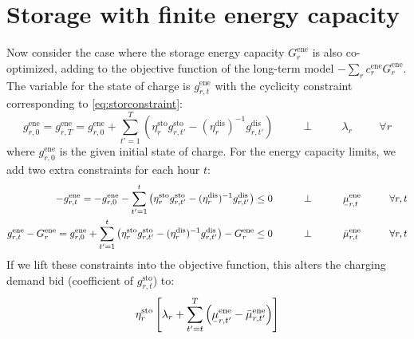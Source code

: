 \documentclass[final,3p]{elsarticle}
\def\l{\lambda} \def\K{\kappa} \def\m{\mu} \def\G{\Gamma} \def\d{\partial}
\begin{document}
\section*{Storage with finite energy capacity}

Now consider the case where the storage energy capacity $G^{\textrm{ene}}_r$ is
also co-optimized, adding to the objective function of the long-term model
$-\sum_r c^{\textrm{ene}}_r G^{\textrm{ene}}_r$. The variable for the state of
charge is $g^{\textrm{ene}}_{r,t}$ with the cyclicity constraint corresponding to 
\eqref{eq:storconstraint}:
\begin{equation}
  g^{\textrm{ene}}_{r,0} = g^{\textrm{ene}}_{r,T} = g^{\textrm{ene}}_{r,0} + \sum_{t'=1}^T \left( \eta^{\textrm{sto}}_r g^{\textrm{sto}}_{r,t'} - (\eta^{\textrm{dis}}_r)^{-1} g^{\textrm{dis}}_{r,t'} \right)   \hspace{1cm}\perp \hspace{1cm} \lambda_{r} \hspace{1cm} \forall r
\end{equation}
where $g^{\textrm{ene}}_{r,0}$ is the given initial state of charge.
For the energy capacity limits, we add two extra constraints for each hour
$t$:
\begin{align}
  -g^{\textrm{ene}}_{r,t} =   -g^{\textrm{ene}}_{r,0} - \sum_{t'=1}^t \left( \eta^{\textrm{sto}}_r g^{\textrm{sto}}_{r,t'} - (\eta^{\textrm{dis}}_r)^{-1} g^{\textrm{dis}}_{r,t'} \right) \leq  0  \hspace{1cm}\perp \hspace{1cm} \ubar{\mu}^{\textrm{ene}}_{r,t} \hspace{1cm} \forall r,t \label{eq:enelower} \\
  g^{\textrm{ene}}_{r,t} - G^{\textrm{ene}}_r = g^{\textrm{ene}}_{r,0} + \sum_{t'=1}^t \left( \eta^{\textrm{sto}}_r g^{\textrm{sto}}_{r,t'} - (\eta^{\textrm{dis}}_r)^{-1} g^{\textrm{dis}}_{r,t'} \right) - G^{\textrm{ene}}_r \leq  0  \hspace{1cm}\perp \hspace{1cm} \bar{\mu}^{\textrm{ene}}_{r,t} \hspace{1cm} \forall r,t \label{eq:eneupper}
\end{align}
If we lift these constraints into the objective function, this alters the
charging demand bid (coefficient of  $g^{\textrm{sto}}_{r,t}$) to:
\begin{equation}
  \eta^{\textrm{sto}}_r \left[ \l_r + \sum_{t'=t}^T \left( \ubar{\mu}^{\textrm{ene}}_{r,t'} -\bar{\mu}^{\textrm{ene}}_{r,t'}  \right) \right]
\end{equation}
\end{document}
